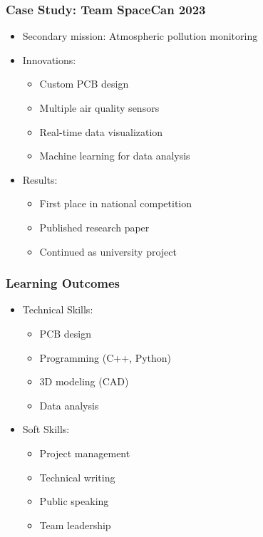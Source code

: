 \documentclass{beamer}
\begin{document}
\begin{frame}
\frametitle{Case Study: Team SpaceCan 2023}
\begin{itemize}
\item Secondary mission: Atmospheric pollution monitoring
\item Innovations:
    \begin{itemize}
    \item Custom PCB design
    \item Multiple air quality sensors
    \item Real-time data visualization
    \item Machine learning for data analysis
    \end{itemize}
\item Results:
    \begin{itemize}
    \item First place in national competition
    \item Published research paper
    \item Continued as university project
    \end{itemize}
\end{itemize}
\end{frame}

\begin{frame}
\frametitle{Learning Outcomes}
\begin{itemize}
\item Technical Skills:
    \begin{itemize}
    \item PCB design
    \item Programming (C++, Python)
    \item 3D modeling (CAD)
    \item Data analysis
    \end{itemize}
\item Soft Skills:
    \begin{itemize}
    \item Project management
    \item Technical writing
    \item Public speaking
    \item Team leadership
    \end{itemize}
\end{itemize}
\end{frame}
\end{document}

